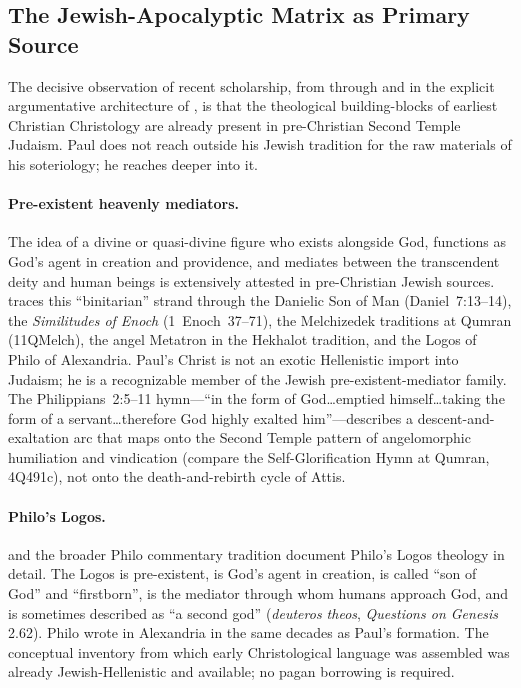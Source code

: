 \documentclass[12pt,oneside]{article}
\begin{document}
\subsection{The Jewish-Apocalyptic Matrix as Primary Source}
\label{sec:myth:jewish}

The decisive observation of recent scholarship, from
\citet{Fredriksen2017} through \citet{Boyarin2012} and in the explicit
argumentative architecture of \citet{Carrier2014}, is that the
theological building-blocks of earliest Christian Christology are
already present in pre-Christian Second Temple Judaism.  Paul does not
reach outside his Jewish tradition for the raw materials of his
soteriology; he reaches deeper into it.

\paragraph{Pre-existent heavenly mediators.}
The idea of a divine or quasi-divine figure who exists alongside God,
functions as God's agent in creation and providence, and mediates
between the transcendent deity and human beings is extensively attested
in pre-Christian Jewish sources.  \citet{Boyarin2012} traces this
\enquote{binitarian} strand through the Danielic Son of Man
(Daniel~7:13--14), the \textit{Similitudes of Enoch} (1~Enoch~37--71),
the Melchizedek traditions at Qumran (11QMelch), the angel Metatron in
the Hekhalot tradition, and the Logos of Philo of Alexandria.  Paul's
Christ is not an exotic Hellenistic import into Judaism; he is a
recognizable member of the Jewish pre-existent-mediator family.  The
Philippians~2:5--11 hymn---\enquote{in the form of God\ldots emptied
himself\ldots taking the form of a servant\ldots therefore God highly
exalted him}---describes a descent-and-exaltation arc that maps onto
the Second Temple pattern of angelomorphic humiliation and vindication
(compare the Self-Glorification Hymn at Qumran, 4Q491c), not onto the
death-and-rebirth cycle of Attis.

\paragraph{Philo's Logos.}
\citet{Sterling2001} and the broader Philo commentary tradition
document Philo's Logos theology in detail.  The Logos is pre-existent,
is God's agent in creation, is called \enquote{son of God} and
\enquote{firstborn}, is the mediator through whom humans approach God,
and is sometimes described as \enquote{a second god}
(\textit{deuteros theos}, \textit{Questions on Genesis} 2.62).  Philo
wrote in Alexandria in the same decades as Paul's formation.  The
conceptual inventory from which early Christological language was
assembled was already Jewish-Hellenistic and available; no pagan
borrowing is required.
\end{document}
